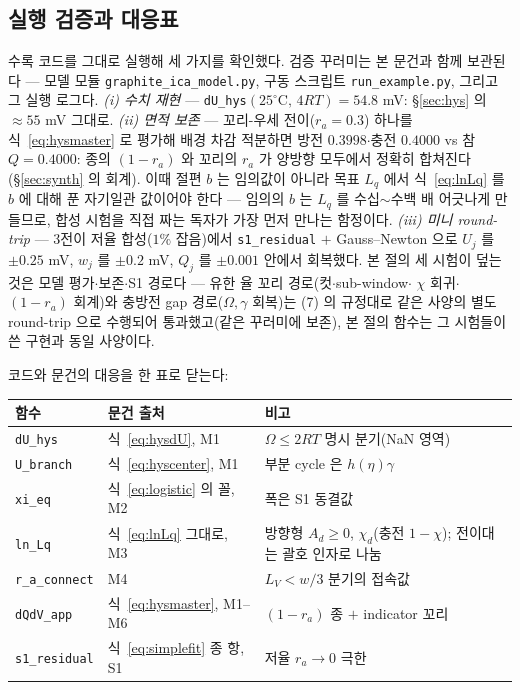\documentclass[11pt,a4paper]{article}
\begin{document}
\subsection{실행 검증과 대응표}\label{sec:codeverify}
수록 코드를 그대로 실행해 세 가지를 확인했다. 검증 꾸러미는 본 문건과 함께 보관된다 — 모델 모듈
\texttt{graphite\_ica\_model.py}, 구동 스크립트 \texttt{run\_example.py}, 그리고 그 실행
로그다.
\emph{(i) 수치 재현} — \texttt{dU\_hys}$(25^\circ\mathrm C,\,4RT)=54.8$ mV: \S\ref{sec:hys} 의
$\approx55$ mV 그대로. \emph{(ii) 면적 보존} — 꼬리-우세 전이($r_a=0.3$) 하나를 식~\eqref{eq:hysmaster}
로 평가해 배경 차감 적분하면 방전 $0.3998$$\cdot$충전 $0.4000$ vs 참 $Q=0.4000$: 종의 $(1-r_a)$ 와
꼬리의 $r_a$ 가 양방향 모두에서 정확히 합쳐진다(\S\ref{sec:synth} 의 회계). 이때 절편 $b$ 는 임의값이 아니라 목표 $L_q$ 에서
식~\eqref{eq:lnLq} 를 $b$ 에 대해 푼 자기일관 값이어야 한다 — 임의의 $b$ 는 $L_q$ 를 수십$\sim$수백 배
어긋나게 만들므로, 합성 시험을 직접 짜는 독자가 가장 먼저 만나는 함정이다. \emph{(iii) 미니
round-trip} — 3전이 저율 합성($1\%$ 잡음)에서 \texttt{s1\_residual} $+$ Gauss--Newton 으로
$U_j$ 를 $\pm0.25$ mV, $w_j$ 를 $\pm0.2$ mV, $Q_j$ 를 $\pm0.001$ 안에서 회복했다. 본 절의 세
시험이 덮는 것은 모델 평가$\cdot$보존$\cdot$S1 경로다 — 유한 율 꼬리 경로(컷$\cdot$sub-window$\cdot$
$\chi$ 회귀$\cdot$$(1-r_a)$ 회계)와 충방전 gap 경로($\Omega,\gamma$ 회복)는 (7) 의 규정대로 같은
사양의 별도 round-trip 으로 수행되어 통과했고(같은 꾸러미에 보존), 본 절의 함수는 그 시험들이 쓴
구현과 동일 사양이다.

코드와 문건의 대응을 한 표로 닫는다:
\begin{center}
\renewcommand{\arraystretch}{1.3}
\begin{tabular}{p{} p{} p{}}
\toprule
함수 & 문건 출처 & 비고 \\
\midrule
\texttt{dU\_hys} & 식~\eqref{eq:hysdU}, M1 & $\Omega\le2RT$ 명시 분기(NaN 영역) \\
\texttt{U\_branch} & 식~\eqref{eq:hyscenter}, M1 & 부분 cycle 은 $h(\eta)\gamma$ \\
\texttt{xi\_eq} & 식~\eqref{eq:logistic} 의 꼴, M2 & 폭은 S1 동결값 \\
\texttt{ln\_Lq} & 식~\eqref{eq:lnLq} 그대로, M3 & 방향형 $A_d\ge0$, $\chi_d$(충전 $1-\chi$); 전이대는 괄호 인자로 나눔 \\
\texttt{r\_a\_connect} & M4 & $L_V<w/3$ 분기의 접속값 \\
\texttt{dQdV\_app} & 식~\eqref{eq:hysmaster}, M1--M6 & $(1-r_a)$ 종 $+$ indicator 꼬리 \\
\texttt{s1\_residual} & 식~\eqref{eq:simplefit} 종 항, S1 & 저율 $r_a\to0$ 극한 \\
\bottomrule
\end{tabular}
\end{center}
\end{document}

